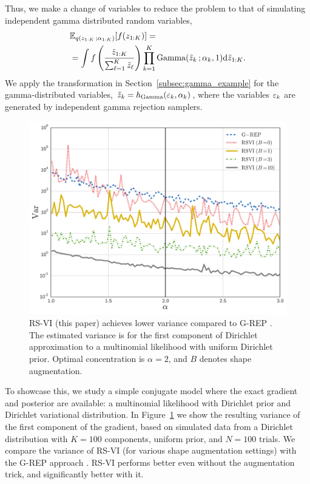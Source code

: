 Thus, we make a change of variables to reduce the problem to that of simulating independent gamma distributed random variables,
\begin{align*}
&\mathbb{E}_{q(z_{1:K}\, ;\alpha_{1:K})}[f(z_{1:K})] =\\
&= \int f\left( \frac{\tilde z_{1:K}}{\sum_{\ell=1}^K \tilde z_\ell}\right)\prod_{k=1}^K\operatorname*{Gamma}(\tilde z_k\, ;\alpha_k,1) \textrm{d} \tilde z_{1:K}.
\end{align*}
We apply the transformation in Section~\ref{subsec:gamma_example} for the gamma-distributed variables, $\tilde z_k = h_{\operatorname*{Gamma}}(\varepsilon_k,\alpha_k)$, where the variables $\varepsilon_k$ are generated by independent gamma rejection samplers.
\begin{figure}[t]
\includegraphics[width=0.9\columnwidth]{dirichletN100K100}
\caption{\gls{RS-VI} (this paper) achieves lower variance compared to \gls{G-REP} \citep{RuizTB2016}. The estimated variance is for the first component of Dirichlet approximation to a multinomial likelihood with uniform Dirichlet prior.  Optimal concentration is $\alpha=2$, and $B$ denotes shape augmentation. %
}\label{fig:dirichlet}
\end{figure}
To showcase this, we study a simple conjugate model where the exact gradient and posterior are available: a multinomial likelihood with Dirichlet prior and Dirichlet variational distribution. In Figure~\ref{fig:dirichlet} we show the resulting variance of the first component of the gradient, based on simulated data from a Dirichlet distribution with $K=100$ components, uniform prior, and $N=100$ trials. We compare the variance of \gls{RS-VI} (for various shape augmentation settings) with the \gls{G-REP} approach \citep{RuizTB2016}. \gls{RS-VI} performs better even without the augmentation trick, and significantly better with it.


